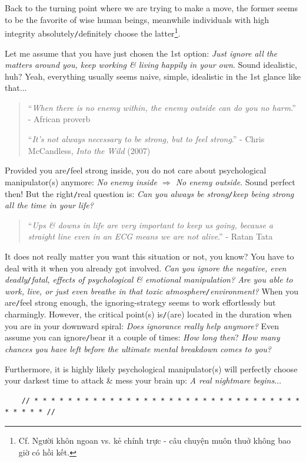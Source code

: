 \documentclass[12pt]{article}
\begin{document}
Back to the turning point where we are trying to make a move, the former seems to be the favorite of wise human beings, meanwhile individuals with high integrity absolutely{\tt/}definitely choose the latter\footnote{Cf. Người khôn ngoan vs. kẻ chính trực - câu chuyện muôn thuở không bao giờ có hồi kết.}.

Let me assume that you have just chosen the 1st option: {\it Just ignore all the matters around you, keep working \& living happily in your own}. Sound idealistic, huh? Yeah, everything usually seems naive, simple, idealistic in the 1st glance like that$\ldots$
\begin{quotation}
	``{\it When there is no enemy within, the enemy outside can do you no harm}.'' - African proverb
	
	``{\it It's not always necessary to be strong, but to feel strong}.'' - Chris McCandless, {\it Into the Wild} (2007)
\end{quotation}
Provided you are{\tt/}feel strong inside, you do not care about psychological manipulator(s) anymore: {\it No enemy inside $\Rightarrow$ No enemy outside}. Sound perfect then! But the right{\tt/}real question is: {\it Can you always be strong{\tt/}keep being strong all the time in your life?}
\begin{quotation}
	``{\it Ups \& downs in life are very important to keep us going, because a straight line even in an ECG means we are not alive}.'' - Ratan Tata
\end{quotation}
It does not really matter you want this situation or not, you know? You have to deal with it when you already got involved. {\it Can you ignore the negative, even deadly{\tt/}fatal, effects of psychological \& emotional manipulation? Are you able to work, live, or just even breathe in that toxic atmosphere{\tt/}environment?} When you are{\tt/}feel strong enough, the ignoring-strategy seems to work effortlessly but charmingly. However, the critical point(s) is{\tt/}(are) located in the duration when you are in your downward spiral: {\it Does ignorance really help anymore?} Even assume you can ignore{\tt/}bear it a couple of times: {\it How long then}? {\it How many chances you have left before the ultimate mental breakdown comes to you?}

Furthermore, it is highly likely psychological manipulator(s) will perfectly choose your darkest time to attack \& mess your brain up: {\it A real nightmare begins}$\ldots$

\begin{verbatim}
	// * * * * * * * * * * * * * * * * * * * * * * * * * * * * * * * * * * * * * //
\end{verbatim}
\end{document}
